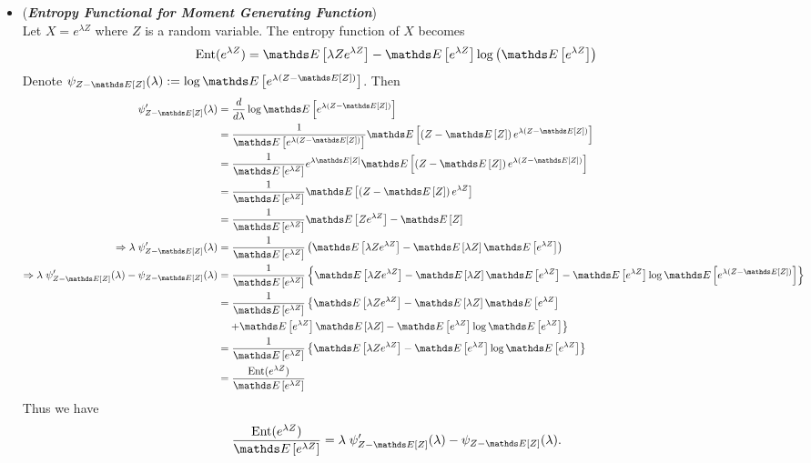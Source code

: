 \documentclass[11pt]{article}
\begin{document}
\begin{itemize}
\item \begin{remark} (\emph{\textbf{Entropy Functional for Moment Generating Function}})\\
Let $X = e^{\lambda Z}$ where $Z$ is a random variable. The entropy function of $X$ becomes
\begin{align*}
\text{Ent}(e^{\lambda Z}) &= \E{}{\lambda Z e^{\lambda Z}} - \E{}{e^{\lambda Z}}\log\paren{\E{}{e^{\lambda Z}}}
\end{align*} Denote $\psi_{Z - \E{}{Z}}(\lambda) := \log\E{}{e^{\lambda (Z - \E{}{Z})}}$. Then
\begin{align*}
\psi_{Z - \E{}{Z}}'(\lambda) &= \frac{d}{d\lambda}\log\E{}{e^{\lambda (Z - \E{}{Z})}}\\
&= \frac{1}{\E{}{e^{\lambda (Z - \E{}{Z})}}}\E{}{\paren{Z - \E{}{Z}} e^{\lambda (Z - \E{}{Z})}}\\
&= \frac{1}{\E{}{e^{\lambda Z}}}e^{\lambda \E{}{Z}}\E{}{\paren{Z - \E{}{Z}} e^{\lambda (Z - \E{}{Z})}}\\
&= \frac{1}{\E{}{e^{\lambda Z}}}\E{}{\paren{Z - \E{}{Z}} e^{\lambda Z}}\\
&= \frac{1}{\E{}{e^{\lambda Z}}}\E{}{Z e^{\lambda Z}} - \E{}{Z}  \\
\Rightarrow \lambda\; \psi_{Z - \E{}{Z}}'(\lambda) &= \frac{1}{\E{}{e^{\lambda Z}}}\paren{\E{}{\lambda Z e^{\lambda Z}} - \E{}{\lambda Z} \E{}{e^{\lambda Z}}} \\
\Rightarrow \lambda\; \psi_{Z - \E{}{Z}}'(\lambda) - \psi_{Z - \E{}{Z}}(\lambda) &= \frac{1}{\E{}{e^{\lambda Z}}}\set{\E{}{\lambda Z e^{\lambda Z}} - \E{}{\lambda Z} \E{}{e^{\lambda Z}} - \E{}{e^{\lambda Z}} \log\E{}{e^{\lambda (Z - \E{}{Z})}}}\\
&=  \frac{1}{\E{}{e^{\lambda Z}}}\left\{\E{}{\lambda Z e^{\lambda Z}} - \E{}{\lambda Z} \E{}{e^{\lambda Z}} \right. \\
&\quad \left. + \E{}{e^{\lambda Z}}\E{}{\lambda Z} - \E{}{e^{\lambda Z}} \log\E{}{e^{\lambda Z}}\right\} \\
&= \frac{1}{\E{}{e^{\lambda Z}}}\set{\E{}{\lambda Z e^{\lambda Z}} - \E{}{e^{\lambda Z}} \log\E{}{e^{\lambda Z}}}\\
&= \frac{\text{Ent}(e^{\lambda Z})}{\E{}{e^{\lambda Z}}}
\end{align*} Thus we have
\begin{align}
\frac{\text{Ent}(e^{\lambda Z})}{\E{}{e^{\lambda Z}}} &= \lambda\; \psi_{Z - \E{}{Z}}'(\lambda) - \psi_{Z - \E{}{Z}}(\lambda). \label{eqn: entropy_log_mgf_differential}
\end{align} 


\end{remark}
\end{itemize}
\end{document}
